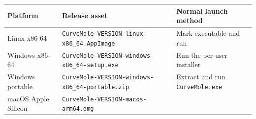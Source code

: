 \documentclass[
  10pt,
  a4paper,
  oneside]{scrreprt}
\begin{document}
\begin{longtable}[]{@{}lll@{}}
\toprule
\begin{minipage}[b]{0.30\columnwidth}\raggedright
Platform\strut
\end{minipage} & \begin{minipage}[b]{0.30\columnwidth}\raggedright
Release asset\strut
\end{minipage} & \begin{minipage}[b]{0.30\columnwidth}\raggedright
Normal launch method\strut
\end{minipage}\tabularnewline
\midrule
\endhead
\begin{minipage}[t]{0.30\columnwidth}\raggedright
Linux x86-64\strut
\end{minipage} & \begin{minipage}[t]{0.30\columnwidth}\raggedright
\texttt{CurveMole-VERSION-linux-x86\_64.AppImage}\strut
\end{minipage} & \begin{minipage}[t]{0.30\columnwidth}\raggedright
Mark executable and run\strut
\end{minipage}\tabularnewline
\begin{minipage}[t]{0.30\columnwidth}\raggedright
Windows x86-64\strut
\end{minipage} & \begin{minipage}[t]{0.30\columnwidth}\raggedright
\texttt{CurveMole-VERSION-windows-x86\_64-setup.exe}\strut
\end{minipage} & \begin{minipage}[t]{0.30\columnwidth}\raggedright
Run the per-user installer\strut
\end{minipage}\tabularnewline
\begin{minipage}[t]{0.30\columnwidth}\raggedright
Windows portable\strut
\end{minipage} & \begin{minipage}[t]{0.30\columnwidth}\raggedright
\texttt{CurveMole-VERSION-windows-x86\_64-portable.zip}\strut
\end{minipage} & \begin{minipage}[t]{0.30\columnwidth}\raggedright
Extract and run \texttt{CurveMole.exe}\strut
\end{minipage}\tabularnewline
\begin{minipage}[t]{0.30\columnwidth}\raggedright
macOS Apple Silicon\strut
\end{minipage} & \begin{minipage}[t]{0.30\columnwidth}\raggedright
\texttt{CurveMole-VERSION-macos-arm64.dmg}\strut

\end{minipage}
\end{longtable}
\end{document}
